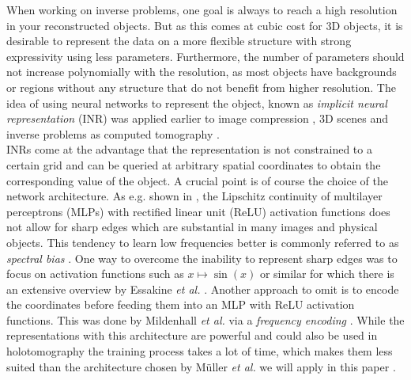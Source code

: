 When working on inverse problems, one goal is always to reach a high resolution in your reconstructed objects.
But as this comes at cubic cost for 3D objects, it is desirable to represent the data on a more flexible structure with strong expressivity using less parameters.
Furthermore, the number of parameters should not increase polynomially with the resolution, as most objects have backgrounds or regions without any structure that do not benefit from higher resolution.
The idea of using neural networks to represent the object, known as \textit{implicit neural representation} (INR) was applied earlier to image compression \cite{donyNeuralNetworkApproaches1995}, 3D scenes \cite{rezendeUnsupervisedLearning3D2018, sitzmannImplicitNeuralRepresentations2020, mullerInstantNeuralGraphics2022} and inverse problems as computed tomography \cite{zhaNAFNeuralAttenuation2022, zhangDynamicConebeamCT2023, essakineWhereWeStand2025}.\\
INRs come at the advantage that the representation is not constrained to a certain grid and can be queried at arbitrary spatial coordinates to obtain the corresponding value of the object.
A crucial point is of course the choice of the network architecture.
As e.g. shown in \cite[Fig. 2(a)]{mullerInstantNeuralGraphics2022}, the Lipschitz continuity of multilayer perceptrons (MLPs) with rectified linear unit (ReLU) activation functions does not allow for sharp edges which are substantial in many images and physical objects.
This tendency to learn low frequencies better is commonly referred to as \textit{spectral bias} \cite{rahamanSpectralBiasNeural2019}.
One way to overcome the inability to represent sharp edges was to focus on activation functions such as \( x \mapsto \sin(x) \) \cite{sitzmannImplicitNeuralRepresentations2020} or similar for which there is an extensive overview by Essakine \textit{et al.} \cite{essakineWhereWeStand2025}. 
Another approach to omit  is to encode the coordinates before feeding them into an MLP with ReLU activation functions.
This was done by Mildenhall \textit{et al.} via a \textit{frequency encoding} \cite{mildenhallNeRFRepresentingScenes2020}.
While the representations with this architecture are powerful and could also be used in holotomography the training process takes a lot of time, which makes them less suited than the architecture chosen by Müller \textit{et al.} we will apply in this paper \cite{mullerInstantNeuralGraphics2022}. 

